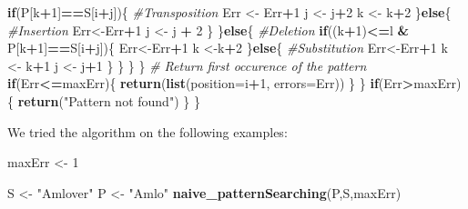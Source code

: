 \documentclass[]{article}
\newenvironment{Shaded}{\begin{snugshade}}{\end{snugshade}}
\newcommand{\KeywordTok}[1]{\textcolor[rgb]{0.13,0.29,0.53}{\textbf{#1}}}
\newcommand{\DataTypeTok}[1]{\textcolor[rgb]{0.13,0.29,0.53}{#1}}
\newcommand{\DecValTok}[1]{\textcolor[rgb]{0.00,0.00,0.81}{#1}}
\newcommand{\StringTok}[1]{\textcolor[rgb]{0.31,0.60,0.02}{#1}}
\newcommand{\CommentTok}[1]{\textcolor[rgb]{0.56,0.35,0.01}{\textit{#1}}}
\newcommand{\ControlFlowTok}[1]{\textcolor[rgb]{0.13,0.29,0.53}{\textbf{#1}}}
\newcommand{\OperatorTok}[1]{\textcolor[rgb]{0.81,0.36,0.00}{\textbf{#1}}}
\newcommand{\NormalTok}[1]{#1}
\begin{document}
\begin{Shaded}
\begin{Highlighting}[]
          \ControlFlowTok{if}\NormalTok{(P[k}\OperatorTok{+}\DecValTok{1}\NormalTok{]}\OperatorTok{==}\NormalTok{S[i}\OperatorTok{+}\NormalTok{j])\{}
            \CommentTok{#Transposition}
\NormalTok{            Err <-}\StringTok{ }\NormalTok{Err}\OperatorTok{+}\DecValTok{1}
\NormalTok{            j   <-}\StringTok{ }\NormalTok{j}\OperatorTok{+}\DecValTok{2}
\NormalTok{            k   <-}\StringTok{ }\NormalTok{k}\OperatorTok{+}\DecValTok{2}
\NormalTok{          \}}\ControlFlowTok{else}\NormalTok{\{}
            \CommentTok{#Insertion}
\NormalTok{            Err<-Err}\OperatorTok{+}\DecValTok{1}
\NormalTok{            j <-}\StringTok{ }\NormalTok{j }\OperatorTok{+}\StringTok{ }\DecValTok{2}
\NormalTok{          \}}
\NormalTok{        \}}\ControlFlowTok{else}\NormalTok{\{}
          \CommentTok{#Deletion}
          \ControlFlowTok{if}\NormalTok{((k}\OperatorTok{+}\DecValTok{1}\NormalTok{)}\OperatorTok{<=}\NormalTok{l }\OperatorTok{&}\StringTok{ }\NormalTok{P[k}\OperatorTok{+}\DecValTok{1}\NormalTok{]}\OperatorTok{==}\NormalTok{S[i}\OperatorTok{+}\NormalTok{j])\{}
\NormalTok{            Err<-Err}\OperatorTok{+}\DecValTok{1}
\NormalTok{            k <-k}\OperatorTok{+}\DecValTok{2}
\NormalTok{          \}}\ControlFlowTok{else}\NormalTok{\{}
            \CommentTok{#Substitution}
\NormalTok{            Err<-Err}\OperatorTok{+}\DecValTok{1}
\NormalTok{            k <-}\StringTok{ }\NormalTok{k}\OperatorTok{+}\DecValTok{1}
\NormalTok{            j <-}\StringTok{ }\NormalTok{j}\OperatorTok{+}\DecValTok{1}
\NormalTok{          \}}
\NormalTok{        \}}
\NormalTok{      \}}
\NormalTok{    \}}
    \CommentTok{# Return first occurence of the pattern}
    \ControlFlowTok{if}\NormalTok{(Err}\OperatorTok{<=}\NormalTok{maxErr)\{}
      \KeywordTok{return}\NormalTok{(}\KeywordTok{list}\NormalTok{(}\DataTypeTok{position=}\NormalTok{i}\OperatorTok{+}\DecValTok{1}\NormalTok{, }\DataTypeTok{errors=}\NormalTok{Err))}
\NormalTok{    \}}
\NormalTok{  \}}
  \ControlFlowTok{if}\NormalTok{(Err}\OperatorTok{>}\NormalTok{maxErr)\{}
    \KeywordTok{return}\NormalTok{(}\StringTok{"Pattern not found"}\NormalTok{)}
\NormalTok{  \}}
\NormalTok{\}}
\end{Highlighting}
\end{Shaded}

We tried the algorithm on the following examples:

\begin{Shaded}
\begin{Highlighting}[]
\NormalTok{maxErr <-}\StringTok{ }\DecValTok{1}

\NormalTok{S <-}\StringTok{ "Amlover"}
\NormalTok{P <-}\StringTok{ "Amlo"}
\KeywordTok{naive_patternSearching}\NormalTok{(P,S,maxErr)}
\end{Highlighting}
\end{Shaded}
\end{document}
